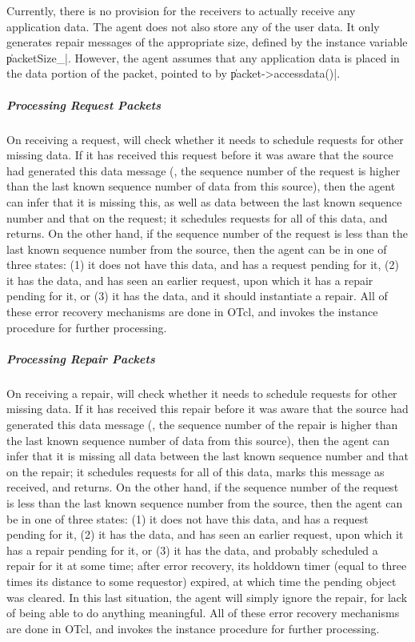 \documentclass{article}
\begin{document}
Currently, there is no provision for the receivers
to actually receive any application data.
The agent does not also store any of the user data.
It only generates repair messages of the appropriate size,
defined by the instance variable \|packetSize\_|.
However, the agent assumes that any application data
is placed in the data portion of the packet,
pointed to by \|packet->accessdata()|.

\subparagraph{Processing Request Packets}
On receiving a request, 
will check whether it needs to schedule requests for other missing data.
If it has received this request
before it was aware that the source had generated this data message
(\ie, the sequence number of the request is higher than 
the last known sequence number of data from this source),
then the agent can infer that it is missing this, as well as
data between the last known sequence number and that on the request;
it schedules requests for all of this data, and returns.
On the other hand, if the sequence number of the request is less
than the last known sequence number from the source,
then the agent can be in one of three states:
(1) it does not have this data, and has a request pending for it,
(2) it has the data, and has seen an earlier request,
    upon which it has a repair pending for it, or
(3) it has the data, and it should instantiate a repair.
All of these error recovery mechanisms are done in OTcl,
and  invokes the instance procedure
for further processing.

\subparagraph{Processing Repair Packets}
On receiving a repair, 
will check whether it needs to schedule requests for other missing data.
If it has received this repair
before it was aware that the source had generated this data message
(\ie, the sequence number of the repair is higher than 
the last known sequence number of data from this source),
then the agent can infer that it is missing all
data between the last known sequence number and that on the repair;
it schedules requests for all of this data,
marks this message as received, and returns.
On the other hand, if the sequence number of the request is less
than the last known sequence number from the source,
then the agent can be in one of three states:
(1) it does not have this data, and has a request pending for it,
(2) it has the data, and has seen an earlier request,
    upon which it has a repair pending for it, or
(3) it has the data, and probably scheduled a repair for it at some time;
    after error recovery, its holddown timer (equal to three times its
    distance to some requestor) expired, at which time the pending object
    was cleared.  In this last situation, the agent will simply ignore
    the repair, for lack of being able to do anything meaningful.
All of these error recovery mechanisms are done in OTcl,
and  invokes the instance procedure
for further processing.
\end{document}

